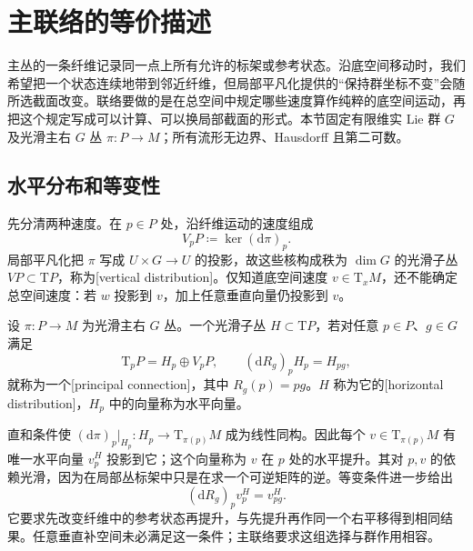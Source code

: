 
% 
% 

\section{主联络的等价描述}
\label{g1:sec:1802}

主丛的一条纤维记录同一点上所有允许的标架或参考状态。沿底空间移动时，我们希望把一个状态连续地带到邻近纤维，但局部平凡化提供的“保持群坐标不变”会随所选截面改变。联络要做的是在总空间中规定哪些速度算作纯粹的底空间运动，再把这个规定写成可以计算、可以换局部截面的形式。本节固定有限维实 Lie 群 \(G\) 及光滑主右 \(G\) 丛 \(\pi:P\to M\)；所有流形无边界、Hausdorff 且第二可数。

\subsection{水平分布和等变性}
\label{g1:subsec:1802:01}

先分清两种速度。在 \(p\in P\) 处，沿纤维运动的速度组成
\[
	V_pP\coloneqq\ker(\mathrm{d}\pi)_p.
\]
局部平凡化把 \(\pi\) 写成 \(U\times G\to U\) 的投影，故这些核构成秩为 \(\dim G\) 的光滑子丛 \(VP\subset \mathrm{T}P\)，称为[vertical distribution]。仅知道底空间速度 \(v\in \mathrm{T}_xM\)，还不能确定总空间速度：若 \(w\) 投影到 \(v\)，加上任意垂直向量仍投影到 \(v\)。

\begin{definition}\label{g1:def:principal-horizontal-connection}
	设 \(\pi:P\to M\) 为光滑主右 \(G\) 丛。一个光滑子丛 \(H\subset \mathrm{T}P\)，若对任意 \(p\in P\)、\(g\in G\) 满足
	\[
		\mathrm{T}_pP=H_p\oplus V_pP,\qquad
		(\mathrm{d}R_g)_pH_p=H_{pg},
	\]
	就称为一个[principal connection]，其中 \(R_g(p)=pg\)。\(H\) 称为它的[horizontal distribution]，\(H_p\) 中的向量称为水平向量。
\end{definition}

直和条件使 \((\mathrm{d}\pi)_p|_{H_p}:H_p\to \mathrm{T}_{\pi(p)}M\) 成为线性同构。因此每个 \(v\in \mathrm{T}_{\pi(p)}M\) 有唯一水平向量 \(v_p^H\) 投影到它；这个向量称为 \(v\) 在 \(p\) 处的水平提升。其对 \(p,v\) 的依赖光滑，因为在局部丛标架中只是在求一个可逆矩阵的逆。等变条件进一步给出
\[
	(\mathrm{d}R_g)_p v_p^H=v_{pg}^H.
\]
它要求先改变纤维中的参考状态再提升，与先提升再作同一个右平移得到相同结果。任意垂直补空间未必满足这一条件；主联络要求这组选择与群作用相容。

